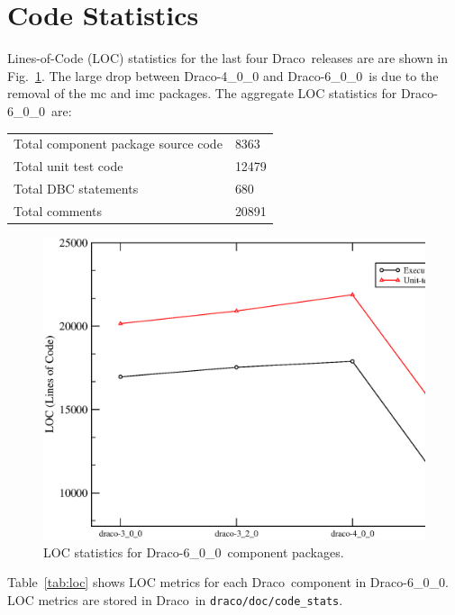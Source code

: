 \documentclass[note]{ResearchNote}
\newcommand{\draco}{Draco}
\newcommand{\dracor}{\draco-6\_0\_0}
\begin{document}

\section{Code Statistics}

Lines-of-Code (LOC) statistics for the last four \draco\ releases are
are shown in Fig.~\ref{fig:stats}.  The large drop between
\draco-4\_0\_0 and \dracor\ is due to the removal of the \textsf{mc}
and \textsf{imc} packages. The aggregate LOC statistics for \dracor\ 
are:
\begin{center}
  \begin{tabular}{|l|l|} \hline
    Total component package source code & 8363 \\
    Total unit test code & 12479 \\
    Total DBC statements & 680 \\
    Total comments & 20891 \\
    \hline
  \end{tabular}
\end{center}
\begin{figure}
  \label{fig:stats}
  \centerline{
    \includegraphics[width=6in]{loc-5_0_0.eps}}
  \caption{LOC statistics for \dracor\ component packages.}
\end{figure}
Table~\ref{tab:loc} shows LOC metrics for each \draco\ component in
\dracor.  LOC metrics are stored in \draco\ in
\texttt{draco/doc/code\_stats}.
\end{document}
